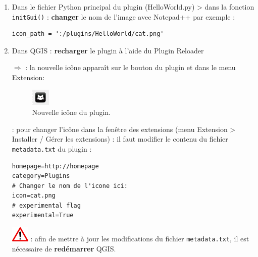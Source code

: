 \documentclass[11pt]{article}
\begin{document}
\begin{enumerate}
\item Dans le fichier Python principal du plugin (\og{}HelloWorld.py\fg{}) > dans la fonction \og{}\texttt{initGui()}\fg{} : \textbf{changer} le nom de l'image avec Notepad++ par exemple :
\vspace*{-1em}
\begin{center}
\begin{minipage}[t]{0.48\textwidth}
\begin{verbatim}
icon_path = ':/plugins/HelloWorld/cat.png'
\end{verbatim}
\end{minipage}
\end{center}

\item Dans QGIS : \textbf{recharger} le plugin à l'aide du \og{}Plugin Reloader\fg{}


$\Rightarrow$ \underline{}: la nouvelle icône apparaît sur le bouton du plugin et dans le menu \og{}Extension\fg{}: 
\begin{figure}[H]
    \centering
    \includegraphics[width=2.4em]{cat.png}
    \vspace*{-0.8em}
    \caption[Nouvelle icône du plugin]{Nouvelle icône du plugin.}
    \label{cat}
\end{figure}

\underline{}: pour changer l'icône dans la fenêtre des extensions (menu \og{}Extension > Installer / Gérer les extensions\fg{}) : il faut modifier le contenu du fichier \og{}\texttt{metadata.txt}\fg{} du plugin : 
\vspace*{-1em}
\begin{center}
\begin{minipage}[t]{0.4\textwidth}
\begin{verbatim}
homepage=http://homepage
category=Plugins
# Changer le nom de l'icone ici:
icon=cat.png
# experimental flag
experimental=True
\end{verbatim}
\end{minipage}
\end{center}



\includegraphics[scale=1]{warningt.png} \underline{}: afin de mettre à jour les modifications du fichier \og{}\texttt{metadata.txt}\fg{}, il est nécessaire de \textbf{redémarrer} QGIS. 

\end{enumerate}
\end{document}
